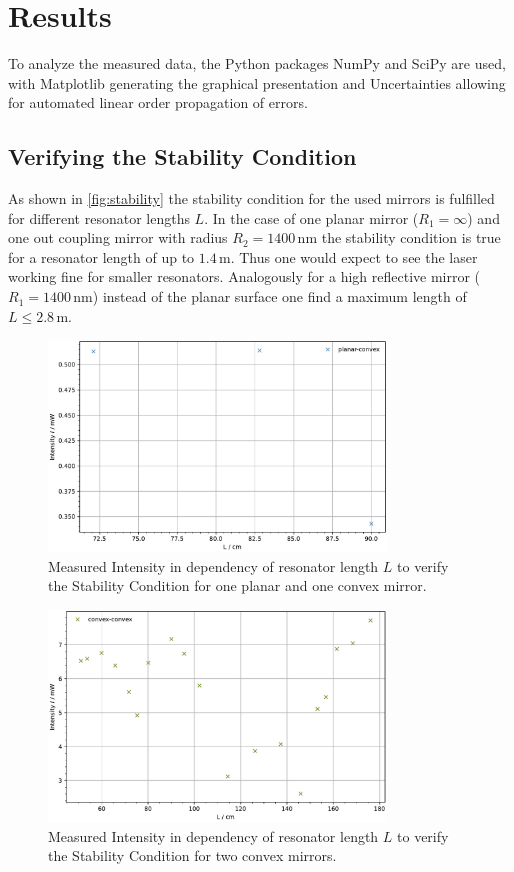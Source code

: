 \section{Results}

To analyze the measured data, the Python \cite{python} packages NumPy \cite{numpy} and SciPy \cite{scipy} are used, with Matplotlib
\cite{matplotlib} generating the graphical presentation and Uncertainties \cite{uncertainties} allowing for automated linear order
propagation of errors.


\subsection{Verifying the Stability Condition}
As shown in \autoref{fig:stability} the stability condition for the used mirrors is fulfilled for different resonator lengths $L$. In the case of one planar mirror ($R_1=\infty$) and one out coupling mirror with radius $R_2=1400\, \unit{\nano \meter}$ the stability condition is true for 
a resonator length of up to $1.4\, \unit{\meter}$. Thus one would expect to see the laser working fine for smaller resonators. Analogously for a high reflective mirror ($R_1=1400\, \unit{\nano \meter}$) instead of the planar surface one find a maximum length of $L\leq 2.8\, \unit{\meter}$.
\begin{figure}
	\centering
	\includegraphics[width=0.8\textwidth]{content/plots/stability2.pdf}
	\caption{Measured Intensity in dependency of resonator length $L$ to verify the Stability Condition for one planar and one convex mirror.}
	\label{fig:stability2}
\end{figure}
\begin{figure}
	\centering
	\includegraphics[width=0.8\textwidth]{content/plots/stability1.pdf}
	\caption{Measured Intensity in dependency of resonator length $L$ to verify the Stability Condition for two convex mirrors.}
	\label{fig:stability1}
\end{figure}
